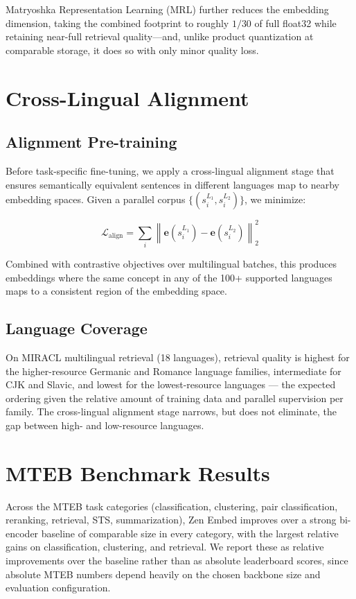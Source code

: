\documentclass[11pt,a4paper]{article}
\begin{document}
Matryoshka Representation Learning (MRL) further reduces the embedding dimension, taking the combined footprint to roughly $1/30$ of full float32 while retaining near-full retrieval quality—and, unlike product quantization at comparable storage, it does so with only minor quality loss.

\section{Cross-Lingual Alignment}

\subsection{Alignment Pre-training}

Before task-specific fine-tuning, we apply a cross-lingual alignment stage that ensures semantically equivalent sentences in different languages map to nearby embedding spaces. Given a parallel corpus $\{(s_i^{L_1}, s_i^{L_2})\}$, we minimize:

\begin{equation}
\mathcal{L}_{\text{align}} = \sum_i \left\|\mathbf{e}(s_i^{L_1}) - \mathbf{e}(s_i^{L_2})\right\|_2^2
\end{equation}

Combined with contrastive objectives over multilingual batches, this produces embeddings where the same concept in any of the 100+ supported languages maps to a consistent region of the embedding space.

\subsection{Language Coverage}

On MIRACL multilingual retrieval (18 languages), retrieval quality is highest for the
higher-resource Germanic and Romance language families, intermediate for CJK and Slavic,
and lowest for the lowest-resource languages — the expected ordering given the relative
amount of training data and parallel supervision per family. The cross-lingual alignment
stage narrows, but does not eliminate, the gap between high- and low-resource languages.

\section{MTEB Benchmark Results}

Across the MTEB task categories (classification, clustering, pair classification,
reranking, retrieval, STS, summarization), Zen Embed improves over a strong bi-encoder
baseline of comparable size in every category, with the largest relative gains on
classification, clustering, and retrieval. We report these as relative improvements over
the baseline rather than as absolute leaderboard scores, since absolute MTEB numbers
depend heavily on the chosen backbone size and evaluation configuration.
\end{document}
